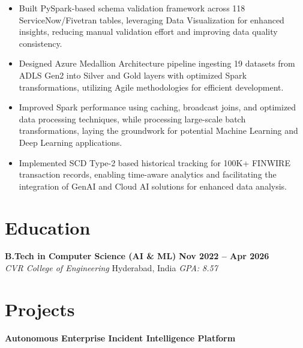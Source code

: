 \documentclass[11pt,a4paper]{article}
\begin{document}
    \vspace{1mm}
    \begin{itemize}[leftmargin=*, topsep=0pt, partopsep=0pt]
        \item Built PySpark-based schema validation framework across 118 ServiceNow/Fivetran tables, leveraging Data Visualization for enhanced insights, reducing manual validation effort and improving data quality consistency.
        \item Designed Azure Medallion Architecture pipeline ingesting 19 datasets from ADLS Gen2 into Silver and Gold layers with optimized Spark transformations, utilizing Agile methodologies for efficient development.
        \item Improved Spark performance using caching, broadcast joins, and optimized data processing techniques, while processing large-scale batch transformations, laying the groundwork for potential Machine Learning and Deep Learning applications.
        \item Implemented SCD Type-2 based historical tracking for 100K+ FINWIRE transaction records, enabling time-aware analytics and facilitating the integration of GenAI and Cloud AI solutions for enhanced data analysis.
    \end{itemize}

\section*{Education}
    \vspace{2mm}
    \noindent
    \textbf{ B.Tech in Computer Science (AI \& ML) } \hfill {\color{brand}\textbf{ Nov 2022 -- Apr 2026 }} \\
    \textit{ CVR College of Engineering } \hfill Hyderabad, India    
    \vspace{1mm}
    \textit{\small GPA: 8.57 }



\section*{Projects}
    \vspace{2mm}
    \noindent
    \textbf{ Autonomous Enterprise Incident Intelligence Platform }
 \\
    
\end{document}

